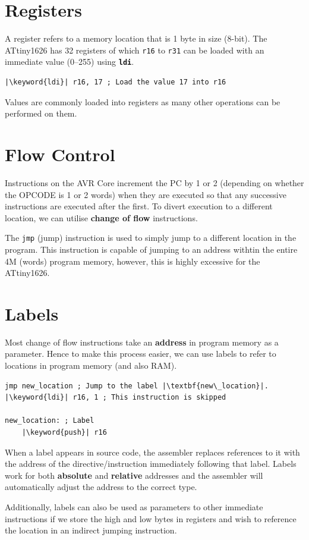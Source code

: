 \documentclass[a4paper]{report}
\newcommand{\keyword}[1]{\textcolor[rgb]{0.00,0.50,0.00}{\textbf{#1}}}
\newcommand{\keywordinline}[1]{\textcolor[rgb]{0.00,0.50,0.00}{\textbf{\texttt{#1}}}}
\begin{document}
\section{Registers}
A register refers to a memory location that is 1 byte in size (8-bit).
The ATtiny1626 has 32 registers of which \texttt{r16} to \texttt{r31} can be loaded with an immediate value (\numrange{0}{255}) using \keywordinline{ldi}.
\begin{verbatim}
|\keyword{ldi}| r16, 17 ; Load the value 17 into r16
\end{verbatim}
Values are commonly loaded into registers as many other operations can be performed on them.
\section{Flow Control}
Instructions on the AVR Core increment the PC by 1 or 2 (depending on whether the OPCODE is 1 or 2 words) when they are executed so that any successive
instructions are executed after the first. To divert execution to a different location, we can utilise
\textbf{change of flow} instructions.

The \texttt{jmp} (jump) instruction is used to simply jump to a different location in the program.
This instruction is capable of jumping to an address withtin the entire 4M (words) program memory, however,
this is highly excessive for the ATtiny1626.
\section{Labels}
Most change of flow instructions take an \textbf{address} in program memory as a parameter.
Hence to make this process easier, we can use labels to refer to locations in program memory (and also RAM).
\begin{verbatim}
jmp new_location ; Jump to the label |\textbf{new\_location}|.
|\keyword{ldi}| r16, 1 ; This instruction is skipped

new_location: ; Label
    |\keyword{push}| r16
\end{verbatim}
When a label appears in source code, the assembler replaces references to it with the address of the
directive/instruction immediately following that label. Labels work for both \textbf{absolute} and \textbf{relative}
addresses and the assembler will automatically adjust the address to the correct type.

Additionally, labels can also be used as parameters to other immediate instructions if we store the high and low
bytes in registers and wish to reference the location in an indirect jumping instruction.
\end{document}
